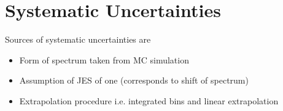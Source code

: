 \section{Systematic Uncertainties}\label{sec:ResFit:Systematics}

Sources of systematic uncertainties are
\begin{itemize}
\item Form of spectrum taken from MC simulation
\item Assumption of JES of one (corresponds to shift of spectrum)
\item Extrapolation procedure i.e. integrated bins and linear extrapolation  
\end{itemize}